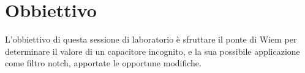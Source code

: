 \section*{Obbiettivo}
L'obbiettivo di questa sessione di laboratorio è sfruttare il ponte di Wiem per determinare il valore di un capacitore incognito, e la sua possibile applicazione come filtro notch, apportate le opportune modifiche.
